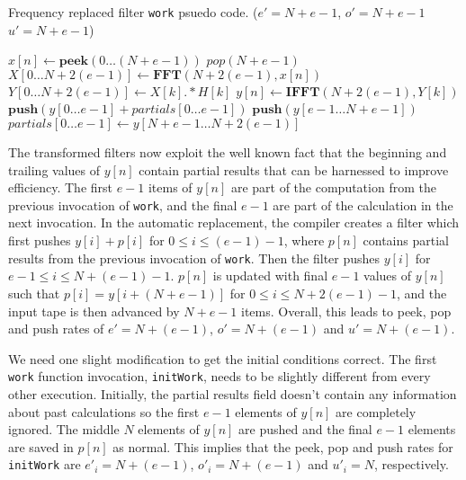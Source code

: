 \begin{algorithm}
  \caption{Frequency replaced filter {\tt work} psuedo code. 
    ($e'=N+e-1$, $o'=N+e-1$ $u'=N+e-1$)\label{alg:freq-work}}
  \begin{algorithmic}
    \STATE $x[n] \leftarrow \mathbf{peek}(0 \dots (N+e-1))$
    \STATE $pop(N+e-1)$
    \STATE $X[0 \dots N+2(e-1)] \leftarrow \mathbf{FFT} (N+2(e-1), x[n])$
    \STATE $Y[0 \dots N+2(e-1)] \leftarrow X[k] .* H[k]$
    \STATE $y[n] \leftarrow \mathbf{IFFT}(N+2(e-1), Y[k])$
    \STATE $\mathbf{push}(y[0 \dots e-1] + partials[0 \dots e-1])$
    \STATE $\mathbf{push}(y[e-1 \dots N+e-1])$
    \STATE $partials[0 \dots e-1] \leftarrow y[N+e-1 \dots N+2(e-1)]$
  \end{algorithmic}
\end{algorithm}


The transformed filters now exploit the well known fact that the 
beginning and trailing values of $y[n]$ contain partial results 
that can be harnessed to improve efficiency.
The first $e-1$ items of $y[n]$ are part of the computation from 
the previous invocation of {\tt work}, and the final $e-1$ are part of the 
calculation in the next invocation.
In the automatic replacement, the compiler creates a filter
which first pushes $y[i]+p[i]$ for $0 \le i \le (e-1)-1$, where $p[n]$
contains partial results from the previous invocation of {\tt work}. 
Then the filter pushes $y[i]$ for $e-1 \le i \le N+(e-1)-1$.
$p[n]$ is updated with final $e-1$ values of $y[n]$ such that $p[i]=y[i+(N+e-1)]$ 
for $0 \le i \le N+2(e-1)-1$, and the input tape is then advanced by $N+e-1$ items.
Overall, this leads to peek, pop and push rates of 
$e'=N+(e-1)$, $o'=N+(e-1)$ and $u'=N+(e-1)$.

We need one slight modification to get the initial conditions correct. 
The first {\tt work} function invocation, {\tt initWork}, 
needs to be slightly different from every other execution. 
Initially, the partial results field doesn't contain any information about past calculations 
so the first $e-1$ elements of $y[n]$ are completely ignored.
The middle $N$ elements of $y[n]$ are pushed and the final $e-1$ elements are
saved in $p[n]$ as normal. This implies that the peek, pop and
push rates for {\tt initWork} are $e'_{i} = N+(e-1)$, $o'_{i}=N+(e-1)$ and 
$u'_{i}=N$, respectively.

